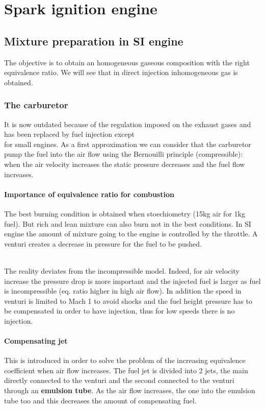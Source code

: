 
\chapter{Spark ignition engine}
\section{Mixture preparation in SI engine}
	The objective is to obtain an homogeneous gaseous composition with the right equivalence ratio. We will see that in direct injection inhomogeneous gas is obtained. 
	
\subsection{The carburetor}
	It is now outdated because of the regulation imposed on the exhaust gases and has been replaced by fuel injection except\ \\
	 
	for small engines.  As a first approximation we can consider that the carburetor pump the fuel into the air flow using the Bernouilli principle (compressible): when the air velocity increases the static pressure decreases and the fuel flow increases. 
	
\subsubsection{Importance of equivalence ratio for combustion}
	The best burning condition is obtained when stoechiometry (15kg air for 1kg fuel). But rich and lean mixture can also burn not in the best conditions. In SI engine the amount of mixture going to the engine is controlled by the throttle. A venturi creates a decrease in pressure for the fuel to be pushed.  
		
	\ \\
	
	The reality deviates from the incompressible model. Indeed, for air velocity increase the pressure drop is more important and the injected fuel is larger as fuel is incompressible (eq. ratio higher in high air flow). In addition the speed in venturi is limited to Mach 1 to avoid shocks and the fuel height pressure has to be compensated in order to have injection, thus for low speeds there is no injection. 
	\newpage

\subsubsection{Compensating jet}
	This is introduced in order to solve the problem of the increasing equivalence coefficient when air flow increases. The fuel jet is divided into 2 jets, the main directly connected to the venturi and the second connected to the venturi through an \textbf{emulsion tube}. As the air flow increases, the one into the emulsion tube too and this decreases the amount of compensating fuel. 
	
